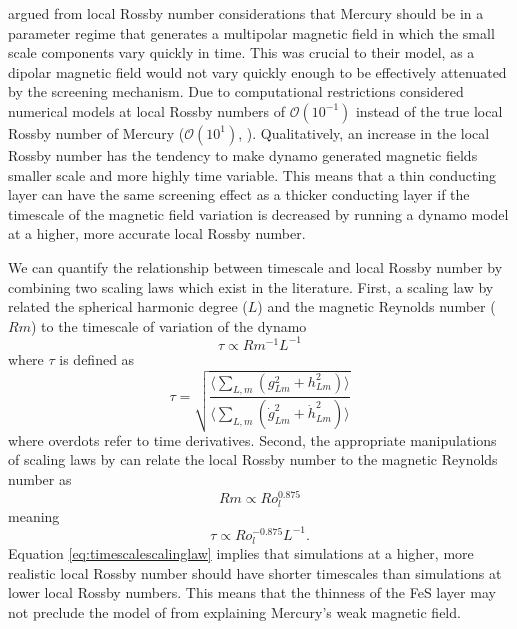 \citet{christensen06} argued from local Rossby number considerations that Mercury should be in a parameter regime that generates a multipolar magnetic field in which the small scale components vary quickly in time. This was crucial to their model, as a dipolar magnetic field would not vary quickly enough to be effectively attenuated by the screening mechanism. Due to computational restrictions \citet{christensen06} considered numerical models at local Rossby numbers of $\mathcal{O}\left(10^{-1}\right)$ instead of the true local Rossby number of Mercury ($\mathcal{O}\left(10^{1}\right)$, \citep{OlsonandChristensen2006}). Qualitatively, an increase in the local Rossby number has the tendency to make dynamo generated magnetic fields smaller scale and more highly time variable. This means that a thin conducting layer can have the same screening effect as a thicker conducting layer if the timescale of the magnetic field variation is decreased by running a dynamo model at a higher, more accurate local Rossby number. 

We can quantify the relationship between timescale and local Rossby number by combining two scaling laws which exist in the literature. First, a scaling law by \citet{christensen2004} related the spherical harmonic degree ($L$) and the magnetic Reynolds number ($Rm$) to the timescale of variation of the dynamo
\begin{equation}
\tau\propto Rm^{-1} L^{-1}
\end{equation}
where $\tau$ is defined as
\begin{equation}
\label{eq:timescale}
\tau=\sqrt{\frac{\langle \sum_{L, m} \left(g_{Lm}^2+h_{Lm}^2\right)\rangle}{\langle \sum_{L, m} \left(\dot{g}_{Lm}^2+\dot{h}_{Lm}^2\right)\rangle}}
\end{equation}
where overdots refer to time derivatives. Second, the appropriate manipulations of scaling laws by \citet{aubert2009} can relate the local Rossby number to the magnetic Reynolds number as
\begin{equation}
Rm\propto Ro_{l}^{0.875}
\end{equation}
meaning
\begin{equation}
\tau\propto Ro_{l}^{-0.875} L^{-1}.
\label{eq:timescalescalinglaw}
\end{equation}
Equation \ref{eq:timescalescalinglaw} implies that simulations at a higher, more realistic local Rossby number should have shorter timescales than simulations at lower local Rossby numbers. This means that the thinness of the FeS layer may not preclude the model of \citet{smith2012} from explaining Mercury's weak magnetic field.

